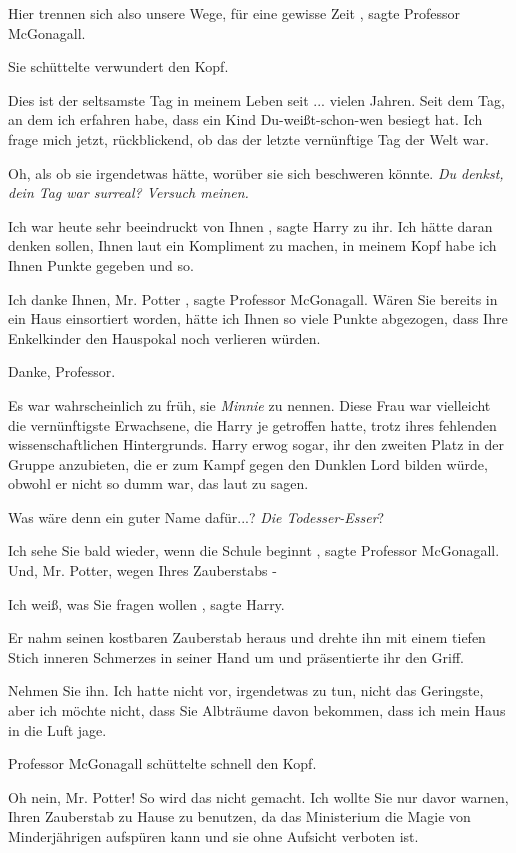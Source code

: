 \glqq Hier trennen sich also unsere Wege, für eine gewisse Zeit\grqq{} , sagte
Professor McGonagall.

Sie schüttelte verwundert den Kopf.

\glqq Dies ist der seltsamste Tag in meinem Leben seit ... vielen Jahren. Seit
dem Tag, an dem ich erfahren habe, dass ein Kind Du-weißt-schon-wen besiegt
hat. Ich frage mich jetzt, rückblickend, ob das der letzte vernünftige Tag
der Welt war.\grqq{}

Oh, als ob sie irgendetwas hätte, worüber sie sich beschweren könnte. \emph{Du
denkst, dein Tag war surreal? Versuch meinen.}

\glqq Ich war heute sehr beeindruckt von Ihnen\grqq{} , sagte Harry zu ihr.
\glqq Ich hätte daran denken sollen, Ihnen laut ein Kompliment zu machen, in
meinem Kopf habe ich Ihnen Punkte gegeben und so.\grqq{}

\glqq Ich danke Ihnen, Mr. Potter\grqq{} , sagte Professor McGonagall. \glqq
Wären Sie bereits in ein Haus einsortiert worden, hätte ich Ihnen so viele
Punkte abgezogen, dass Ihre Enkelkinder den Hauspokal noch verlieren
würden.\grqq{}

\glqq Danke, Professor.\grqq{}

Es war wahrscheinlich zu früh, sie \emph{Minnie} zu nennen. Diese Frau war
vielleicht die vernünftigste Erwachsene, die Harry je getroffen hatte, trotz
ihres fehlenden wissenschaftlichen Hintergrunds. Harry erwog sogar, ihr den
zweiten Platz in der Gruppe anzubieten, die er zum Kampf gegen den Dunklen
Lord bilden würde, obwohl er nicht so dumm war, das laut zu sagen.

Was wäre denn ein guter Name dafür...? \emph{Die Todesser-Esser}?

\glqq Ich sehe Sie bald wieder, wenn die Schule beginnt\grqq{} , sagte Professor
McGonagall. \glqq Und, Mr. Potter, wegen Ihres Zauberstabs -\grqq{}

\glqq Ich weiß, was Sie fragen wollen\grqq{} , sagte Harry.

Er nahm seinen kostbaren Zauberstab heraus und drehte ihn mit einem tiefen Stich
inneren Schmerzes in seiner Hand um und präsentierte ihr den Griff.

\glqq Nehmen Sie ihn. Ich hatte nicht vor, irgendetwas zu tun, nicht das
Geringste, aber ich möchte nicht, dass Sie Albträume davon bekommen, dass
ich mein Haus in die Luft jage.\grqq{}

Professor McGonagall schüttelte schnell den Kopf.

\glqq Oh nein, Mr. Potter! So wird das nicht gemacht. Ich wollte Sie nur davor
warnen, Ihren Zauberstab zu Hause zu benutzen, da das Ministerium die Magie
von Minderjährigen aufspüren kann und sie ohne Aufsicht verboten ist.\grqq{}

